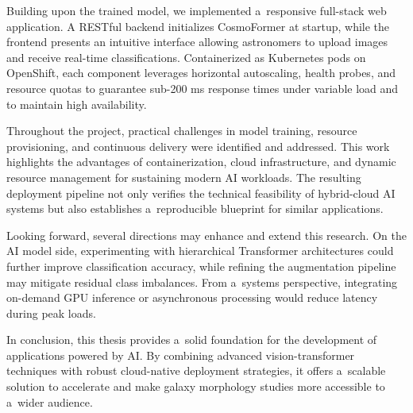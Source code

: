 Building upon the trained model, we implemented a~responsive full-stack web application. A RESTful backend initializes CosmoFormer at startup, while the frontend presents an intuitive interface allowing astronomers to upload images and receive real-time classifications. Containerized as Kubernetes pods on OpenShift, each component leverages horizontal autoscaling, health probes, and resource quotas to guarantee sub-200 ms response times under variable load and to maintain high availability.

Throughout the project, practical challenges in model training, resource provisioning, and continuous delivery were identified and addressed. This work highlights the advantages of containerization, cloud infrastructure, and dynamic resource management for sustaining modern AI workloads. The resulting deployment pipeline not only verifies the technical feasibility of hybrid-cloud AI systems but also establishes a~reproducible blueprint for similar applications.

Looking forward, several directions may enhance and extend this research. On the AI model side, experimenting with hierarchical Transformer architectures could further improve classification accuracy, while refining the augmentation pipeline may mitigate residual class imbalances. From a~systems perspective, integrating on-demand GPU inference or asynchronous processing would reduce latency during peak loads.

In conclusion, this thesis provides a~solid foundation for the development of applications powered by AI. By combining advanced vision-transformer techniques with robust cloud-native deployment strategies, it offers a~scalable solution to accelerate and make galaxy morphology studies more accessible to a~wider audience.


% 